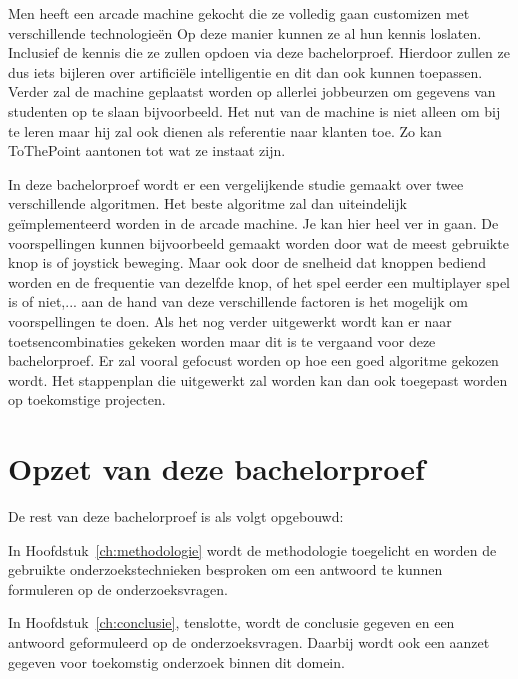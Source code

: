 Men heeft een arcade machine gekocht die ze volledig gaan customizen met verschillende technologieën Op deze manier kunnen ze al hun kennis loslaten. Inclusief de kennis die ze zullen opdoen via deze bachelorproef. Hierdoor zullen ze dus iets bijleren over artificiële intelligentie en dit dan ook kunnen toepassen. Verder zal de machine geplaatst worden op allerlei jobbeurzen om gegevens van studenten op te slaan bijvoorbeeld. Het nut van de machine is niet alleen om bij te leren maar hij zal ook dienen als referentie naar klanten toe. Zo kan ToThePoint aantonen tot wat ze instaat zijn. 

In deze bachelorproef wordt er een vergelijkende studie gemaakt over twee verschillende algoritmen. Het beste algoritme zal dan uiteindelijk geïmplementeerd worden in de arcade machine. Je kan hier heel ver in gaan. De voorspellingen kunnen bijvoorbeeld gemaakt worden door wat de meest gebruikte knop is of joystick beweging. Maar ook door de snelheid dat knoppen bediend worden en de frequentie van dezelfde knop, of het spel eerder een multiplayer spel is of niet,...  aan de hand van deze verschillende factoren is het mogelijk om voorspellingen te doen. Als het nog verder uitgewerkt wordt kan er naar toetsencombinaties gekeken worden maar dit is te vergaand voor deze bachelorproef. Er zal vooral gefocust worden op hoe een goed algoritme gekozen wordt. Het stappenplan die uitgewerkt zal worden kan dan ook toegepast worden op toekomstige projecten.



\section{Opzet van deze bachelorproef}
\label{sec:opzet-bachelorproef}


De rest van deze bachelorproef is als volgt opgebouwd:

In Hoofdstuk~\ref{ch:methodologie} wordt de methodologie toegelicht en worden de gebruikte onderzoekstechnieken besproken om een antwoord te kunnen formuleren op de onderzoeksvragen.


In Hoofdstuk~\ref{ch:conclusie}, tenslotte, wordt de conclusie gegeven en een antwoord geformuleerd op de onderzoeksvragen. Daarbij wordt ook een aanzet gegeven voor toekomstig onderzoek binnen dit domein.

